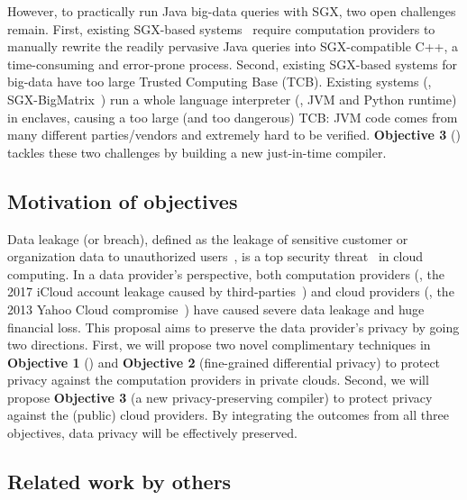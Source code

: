 However, to practically run Java big-data queries with SGX, two open challenges 
remain. First, existing SGX-based systems~\cite{opaque:nsdi17} require 
computation providers to manually rewrite the readily pervasive Java 
queries into SGX-compatible C++, a time-consuming and error-prone process.
Second, existing SGX-based systems for big-data have too large Trusted 
Computing Base (TCB). Existing systems 
(\eg, SGX-BigMatrix~\cite{bigmatrix:ccs17}) run a whole language interpreter 
(\eg, JVM and Python runtime) in enclaves, causing a too large (and too 
dangerous) TCB: JVM code comes from many different parties/vendors and 
extremely hard to be verified. \textbf{Objective 3} () tackles
these two challenges by building a new just-in-time compiler.

\vspace{-.15in}\subsection{Motivation of objectives} 
\label{sec:motivation}\vspace{-.075in}


Data leakage (or breach), defined as the leakage of sensitive customer or 
organization data to unauthorized users~\cite{kazim2015survey}, is a top 
security threat~\cite{top-threats,privacy:bigdata:rand} in cloud computing. In 
a data provider's perspective, both computation providers (\eg, the 2017 iCloud 
account leakage caused by third-parties~\cite{icloud-breach}) and cloud 
providers (\eg, the 2013 Yahoo Cloud compromise~\cite{yahoo-dropbox-breach}) 
have caused severe data leakage and huge financial loss. This proposal aims to 
preserve the data provider's privacy by going two directions. First, we will 
propose two novel complimentary techniques in \textbf{Objective 1} (\kakute) and 
\textbf{Objective 2} (fine-grained differential privacy) to protect privacy 
against the computation providers in private clouds. Second, we will propose 
\textbf{Objective 3} (a new privacy-preserving compiler) to protect privacy 
against the (public) cloud providers. By integrating the outcomes from all three 
objectives, data privacy will be effectively preserved.

\vspace{-.15in}\subsection{Related work by others} 
\label{sec:others-work}\vspace{-.075in}

